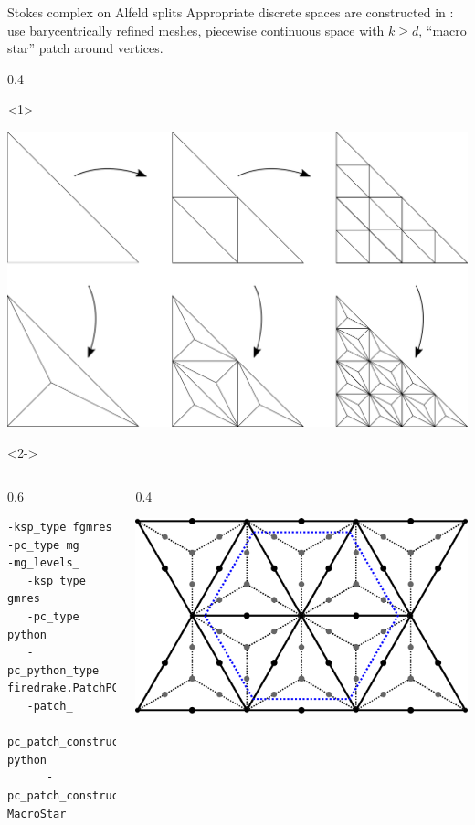 \documentclass[presentation,aspectratio=43, 10pt]{beamer}
\begin{document}
\begin{frame}[fragile,t]
\begin{block}{Stokes complex on Alfeld splits}
    Appropriate discrete spaces are constructed in \textcite{Fu:2018}: use
    barycentrically refined meshes, piecewise continuous space with $k
    \ge d$, ``macro star'' patch around vertices.
  \end{block}
  \begin{overlayarea}{\textwidth}{0.4\textheight}
    \begin{onlyenv}<1>
      \begin{center}
        \includegraphics[height=0.4\textheight]{mh_bary_5}
      \end{center}
    \end{onlyenv}
    \begin{onlyenv}<2->
  \begin{columns}[T]
    \begin{column}{0.6\textwidth}
\begin{verbatim}
-ksp_type fgmres
-pc_type mg
-mg_levels_
   -ksp_type gmres
   -pc_type python
   -pc_python_type firedrake.PatchPC
   -patch_
      -pc_patch_construct_type python
      -pc_patch_construct_python_type MacroStar
\end{verbatim}
    \end{column}
    \begin{column}{0.4\textwidth}
      \vspace{-1.5em}
      \begin{center}
        \includegraphics[height=0.4\textheight]{macrostar}

\end{center}
\end{column}
\end{columns}
\end{onlyenv}
\end{overlayarea}
\end{frame}
\end{document}
